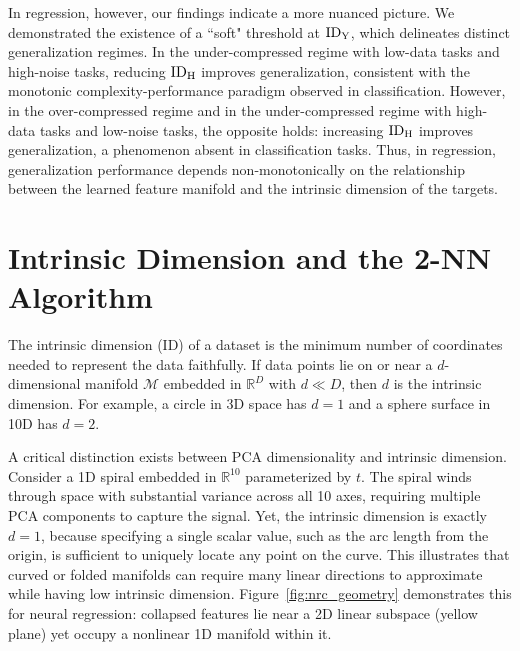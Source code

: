 In regression, however, our findings indicate a more nuanced picture. We demonstrated the existence of a ``soft" threshold at $\mathrm{ID}_{\mathrm{Y}}$, which delineates distinct generalization regimes. In the under-compressed regime with low-data tasks and high-noise tasks, reducing $\mathrm{ID}_{\mathrm{H}}$ improves generalization, consistent with the monotonic complexity-performance paradigm observed in classification. However, in the over-compressed regime and in the under-compressed regime with high-data tasks and low-noise tasks, the opposite holds: increasing $\mathrm{ID}_{\mathrm{H}}$ improves generalization, a phenomenon absent in classification tasks. Thus, in regression, generalization performance depends non-monotonically on the relationship between the learned feature manifold and the intrinsic dimension of the targets.


\section{Intrinsic Dimension and the 2-NN Algorithm} \label{2nnalg}
The intrinsic dimension (ID) of a dataset is the minimum number of coordinates needed to represent the data faithfully. If data points lie on or near a $d$-dimensional manifold $\mathcal{M}$ embedded in $\mathbb{R}^D$ with $d \ll D$, then $d$ is the intrinsic dimension. For example, a circle in 3D space has $d = 1$ and a sphere surface in 10D has $d = 2$.

A critical distinction exists between PCA dimensionality and intrinsic dimension. Consider a 1D spiral embedded in $\mathbb{R}^{10}$ parameterized by $t$. The spiral winds through space with substantial variance across all 10 axes, requiring multiple PCA components to capture the signal. Yet, the intrinsic dimension is exactly $d=1$, because specifying a single scalar value, such as the arc length from the origin, is sufficient to uniquely locate any point on the curve. This illustrates that curved or folded manifolds can require many linear directions to approximate while having low intrinsic dimension. Figure~\ref{fig:nrc_geometry} demonstrates this for neural regression: collapsed features lie near a 2D linear subspace (yellow plane) yet occupy a nonlinear 1D manifold within it.


